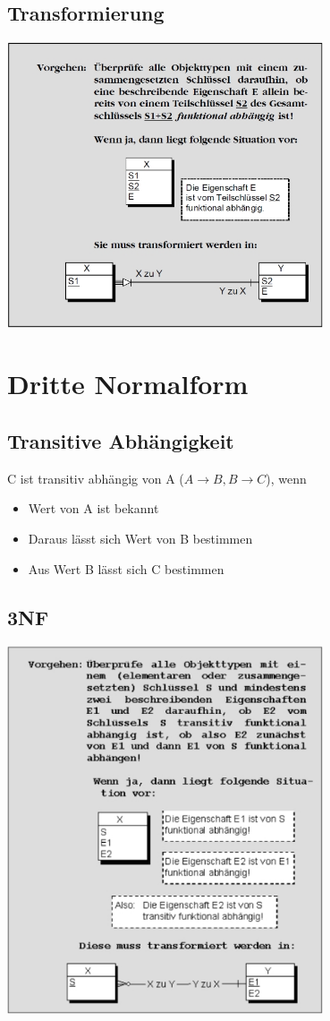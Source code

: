 \documentclass{scrreprt}
\begin{document}
\subsection{Transformierung}
\includegraphics[width=0.7\textwidth]{"graphics/2NF"}
\section{Dritte Normalform}
\subsection{Transitive Abhängigkeit}
C ist transitiv abhängig von A ($A \rightarrow B, B \rightarrow C$), wenn
\begin{itemize}
  \item Wert von A ist bekannt
  \item Daraus lässt sich Wert von B bestimmen
  \item Aus Wert B lässt sich C bestimmen
\end{itemize}
\subsection{3NF}
\includegraphics[width=0.7\textwidth]{"graphics/3NF"}
\end{document}
